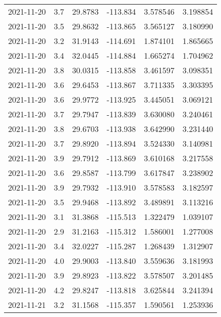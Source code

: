 \begin{tabular}{lrrrrr}
2021-11-20 &       3.7 &  29.8783 &  -113.834 &         3.578546 &         3.198854 \\
2021-11-20 &       3.5 &  29.8632 &  -113.865 &         3.565127 &         3.180990 \\
2021-11-20 &       3.2 &  31.9143 &  -114.691 &         1.874101 &         1.865665 \\
2021-11-20 &       3.4 &  32.0445 &  -114.884 &         1.665274 &         1.704962 \\
2021-11-20 &       3.8 &  30.0315 &  -113.858 &         3.461597 &         3.098351 \\
2021-11-20 &       3.6 &  29.6453 &  -113.867 &         3.711335 &         3.303395 \\
2021-11-20 &       3.6 &  29.9772 &  -113.925 &         3.445051 &         3.069121 \\
2021-11-20 &       3.7 &  29.7947 &  -113.839 &         3.630080 &         3.240461 \\
2021-11-20 &       3.8 &  29.6703 &  -113.938 &         3.642990 &         3.231440 \\
2021-11-20 &       3.7 &  29.8920 &  -113.894 &         3.524330 &         3.140981 \\
2021-11-20 &       3.9 &  29.7912 &  -113.869 &         3.610168 &         3.217558 \\
2021-11-20 &       3.6 &  29.8587 &  -113.799 &         3.617847 &         3.238902 \\
2021-11-20 &       3.9 &  29.7932 &  -113.910 &         3.578583 &         3.182597 \\
2021-11-20 &       3.5 &  29.9468 &  -113.892 &         3.489891 &         3.113216 \\
2021-11-20 &       3.1 &  31.3868 &  -115.513 &         1.322479 &         1.039107 \\
2021-11-20 &       2.9 &  31.2163 &  -115.312 &         1.586001 &         1.277008 \\
2021-11-20 &       3.4 &  32.0227 &  -115.287 &         1.268439 &         1.312907 \\
2021-11-20 &       4.0 &  29.9003 &  -113.840 &         3.559636 &         3.181993 \\
2021-11-20 &       3.9 &  29.8923 &  -113.822 &         3.578507 &         3.201485 \\
2021-11-20 &       4.2 &  29.8247 &  -113.818 &         3.625844 &         3.241394 \\
2021-11-21 &       3.2 &  31.1568 &  -115.357 &         1.590561 &         1.253936 \\

\end{tabular}
